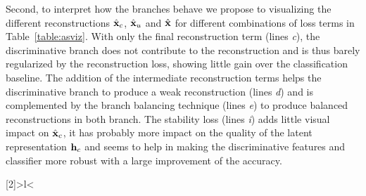 \documentclass[runningheads]{llncs}
\begin{document}
Second, to interpret how the branches behave we propose to visualizing the different reconstructions $\hat{\mathbf{x}}_c$, $\hat{\mathbf{x}}_u$ and $\hat{\mathbf{x}}$ for different combinations of loss terms in Table~\ref{table:asviz}. With only the final reconstruction term (lines \textit{c}), the discriminative branch does not contribute to the reconstruction and is thus barely regularized by the reconstruction loss, showing little gain over the classification baseline. The addition of the intermediate reconstruction terms helps the discriminative branch to produce a weak reconstruction (lines \textit{d}) and is complemented by the branch balancing technique (lines \textit{e}) to produce balanced reconstructions in both branch. The stability loss (lines \textit{i}) adds little visual impact on $\hat{\mathbf{x}}_c$, it has probably more impact on the quality of the latent representation $\mathbf{h}_c$ and seems to help in making the discriminative features and classifier more robust with a large improvement of the accuracy.


\newcolumntype{R}[2]{>{\bgroup}l<{\egroup}}

\newcommand{\rowmidlinewc}{\arrayrulecolor{verylightgray}\cmidrule{1-8}
            \arrayrulecolor{black}}
\newcommand{\rowmidlinewcb}{\arrayrulecolor{verylightgray}\cmidrule{1-5}
            \arrayrulecolor{black}}

\newcommand{\rot}{\multicolumn{1}{R{65}{1em}}}
\newcommand{\n}{\color{RoyalBlue}}
\newcommand*\OK{\ding{51}}

\newcommand{\spa}{\ \;}
\newcommand{\spb}{\quad\;}
\end{document}
